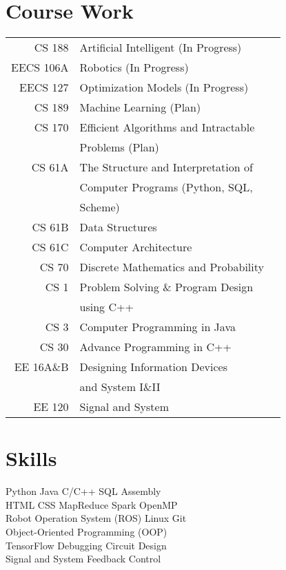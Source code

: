 \documentclass{tccv}
\begin{document}
\section{Course Work}
\begin{tabular}{rll}
CS 188&Artificial Intelligent (In Progress)\\
EECS 106A&Robotics (In Progress)\\
EECS 127&Optimization Models (In Progress)\\
CS 189 & Machine Learning (Plan)\\
CS 170 & Efficient Algorithms and Intractable\\
    &   Problems (Plan)\\
CS 61A  &   The Structure and Interpretation of\\
        &   Computer Programs (Python, SQL, \\
        &   Scheme)\\
CS 61B  &   Data Structures\\
CS 61C  &   Computer Architecture\\
CS 70   &   Discrete Mathematics and Probability\\
CS 1&Problem Solving \& Program Design\\
    &   using C++\\
CS 3& Computer Programming in Java\\
CS 30&Advance Programming in C++\\
EE 16A\&B    &   Designing Information Devices\\
        &   and System I\&II\\
EE 120  &   Signal and System
\end{tabular}

\section{Skills}

Python \textbullet{} Java \textbullet{} C/C++ \textbullet{} SQL \textbullet{} Assembly\smallskip\\
HTML \textbullet{} CSS \textbullet{} MapReduce \textbullet{} Spark \textbullet{} OpenMP\smallskip\\
Robot Operation System (ROS) \textbullet{} Linux \textbullet{} Git \smallskip\\ Object-Oriented Programming (OOP)\smallskip\\
TensorFlow \textbullet{} Debugging \textbullet{} Circuit Design\smallskip\\
Signal and System \textbullet{} Feedback Control
\end{document}
